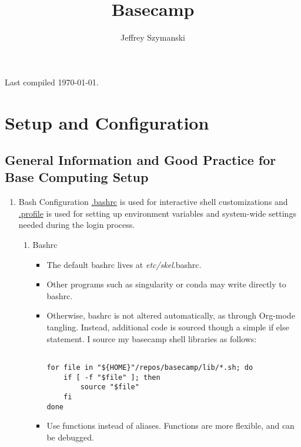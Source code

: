 \documentclass{article}
\author{Jeffrey Szymanski}
\date{}
\title{Basecamp}
\begin{document}
\maketitle
\tableofcontents

\vspace{5mm}
\hfill Last compiled \today.


\section{Setup and Configuration}
\label{sec:org3047978}
\subsection{General Information and Good Practice for Base Computing Setup}
\label{sec:org7da33bb}
\begin{enumerate}
\item Bash Configuration
\label{sec:orgc451dff}
\href{file:///home/jeszyman/.bashrc}{.bashrc} is used for interactive shell customizations and \href{file:///home/jeszyman/.profile}{.profile} is used for setting up environment variables and system-wide settings needed during the login process.\\[0pt]
\begin{enumerate}
\item Bashrc
\label{sec:org1574c7a}
\begin{itemize}
\item The default bashrc lives at \emph{etc/skel}.bashrc.\\[0pt]
\item Other programs such as singularity or conda may write directly to bashrc.\\[0pt]
\item Otherwise, bashrc is not altered automatically, as through Org-mode tangling. Instead, additional code is sourced though a simple if else statement. I source my basecamp shell libraries as follows:\\[0pt]

\begin{verbatim}

for file in "${HOME}"/repos/basecamp/lib/*.sh; do
    if [ -f "$file" ]; then
        source "$file"
    fi
done

\end{verbatim}

\item Use functions instead of aliases. Functions are more flexible, and can be debugged.\\[0pt]
\end{itemize}
\end{enumerate}
\end{enumerate}
\end{document}
